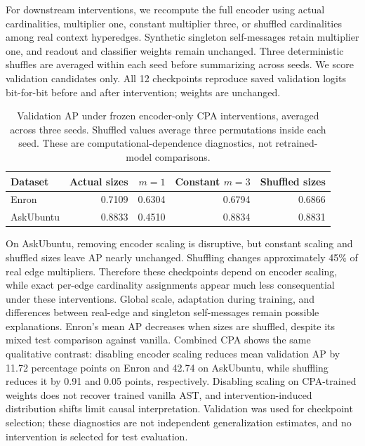\documentclass{article}
\begin{document}
For downstream interventions, we recompute the full encoder using actual cardinalities, multiplier one, constant multiplier three, or shuffled cardinalities among real context hyperedges. Synthetic singleton self-messages retain multiplier one, and readout and classifier weights remain unchanged. Three deterministic shuffles are averaged within each seed before summarizing across seeds. We score validation candidates only. All 12 checkpoints reproduce saved validation logits bit-for-bit before and after intervention; weights are unchanged.

\begin{table}[t]
\centering
\small
\caption{Validation AP under frozen encoder-only CPA interventions, averaged across three seeds. Shuffled values average three permutations inside each seed. These are computational-dependence diagnostics, not retrained-model comparisons.}
\label{tab:encoder-interventions}
\begin{tabular}{lrrrr}
\toprule
Dataset & Actual sizes & $m=1$ & Constant $m=3$ & Shuffled sizes \\
\midrule
Enron & 0.7109 & 0.6304 & 0.6794 & 0.6866 \\
AskUbuntu & 0.8833 & 0.4510 & 0.8834 & 0.8831 \\
\bottomrule
\end{tabular}
\end{table}

On AskUbuntu, removing encoder scaling is disruptive, but constant scaling and shuffled sizes leave AP nearly unchanged. Shuffling changes approximately 45\% of real edge multipliers. Therefore these checkpoints depend on encoder scaling, while exact per-edge cardinality assignments appear much less consequential under these interventions. Global scale, adaptation during training, and differences between real-edge and singleton self-messages remain possible explanations. Enron's mean AP decreases when sizes are shuffled, despite its mixed test comparison against vanilla. Combined CPA shows the same qualitative contrast: disabling encoder scaling reduces mean validation AP by 11.72 percentage points on Enron and 42.74 on AskUbuntu, while shuffling reduces it by 0.91 and 0.05 points, respectively. Disabling scaling on CPA-trained weights does not recover trained vanilla AST, and intervention-induced distribution shifts limit causal interpretation. Validation was used for checkpoint selection; these diagnostics are not independent generalization estimates, and no intervention is selected for test evaluation.
\end{document}

